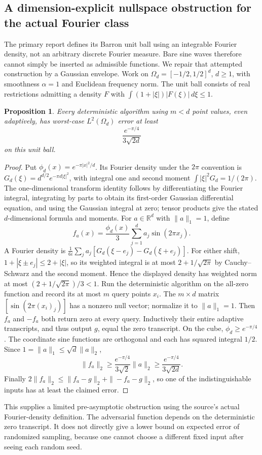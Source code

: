 \documentclass[11pt]{article}
\newtheorem{proposition}{Proposition}
\begin{document}
\subsection{A dimension-explicit nullspace obstruction for the actual Fourier class}
The primary report defines its Barron unit ball using an integrable Fourier density, not an arbitrary discrete Fourier measure. Bare sine waves therefore cannot simply be inserted as admissible functions. We repair that attempted construction by a Gaussian envelope. Work on $\Omega_d=[-1/2,1/2]^d$, $d\ge1$, with smoothness $\alpha=1$ and Euclidean frequency norm. The unit ball consists of real restrictions admitting a density $F$ with $\int(1+|\xi|)|F(\xi)|\,d\xi\le1$.
\begin{proposition}
Every deterministic algorithm using $m<d$ point values, even adaptively, has worst-case $L^2(\Omega_d)$ error at least
\[
\frac{e^{-\pi/4}}{3\sqrt{2d}}
\]
on this unit ball.
\end{proposition}
\begin{proof}
Put $\phi_d(x)=e^{-\pi|x|^2/d}$. Its Fourier density under the $2\pi$ convention is $G_d(\xi)=d^{d/2}e^{-\pi d|\xi|^2}$, with integral one and second moment $\int|\xi|^2G_d=1/(2\pi)$. The one-dimensional transform identity follows by differentiating the Fourier integral, integrating by parts to obtain its first-order Gaussian differential equation, and using the Gaussian integral at zero; tensor products give the stated $d$-dimensional formula and moments.
For $a\in\mathbb R^d$ with $\|a\|_1=1$, define
\[
f_a(x)=\frac{\phi_d(x)}3\sum_{j=1}^d a_j\sin(2\pi x_j).
\]
A Fourier density is $\frac1{6i}\sum_j a_j[G_d(\xi-e_j)-G_d(\xi+e_j)]$. For either shift, $1+|\xi\pm e_j|\le2+|\xi|$, so its weighted integral is at most $2+1/\sqrt{2\pi}$ by Cauchy--Schwarz and the second moment. Hence the displayed density has weighted norm at most $(2+1/\sqrt{2\pi})/3<1$.
Run the deterministic algorithm on the all-zero function and record its at most $m$ query points $x_i$. The $m\times d$ matrix $[\sin(2\pi(x_i)_j)]$ has a nonzero null vector; normalize it to $\|a\|_1=1$. Then $f_a$ and $-f_a$ both return zero at every query. Inductively their entire adaptive transcripts, and thus output $g$, equal the zero transcript.
On the cube, $\phi_d\ge e^{-\pi/4}$. The coordinate sine functions are orthogonal and each has squared integral $1/2$. Since $1=\|a\|_1\le\sqrt d\|a\|_2$,
\[
\|f_a\|_2\ge\frac{e^{-\pi/4}}{3\sqrt2}\|a\|_2
\ge\frac{e^{-\pi/4}}{3\sqrt{2d}}.
\]
Finally $2\|f_a\|_2\le\|f_a-g\|_2+\|-f_a-g\|_2$, so one of the indistinguishable inputs has at least the claimed error.
\end{proof}
This supplies a limited pre-asymptotic obstruction using the source's actual Fourier-density definition. The adversarial function depends on the deterministic zero transcript. It does not directly give a lower bound on expected error of randomized sampling, because one cannot choose a different fixed input after seeing each random seed.
\end{document}
